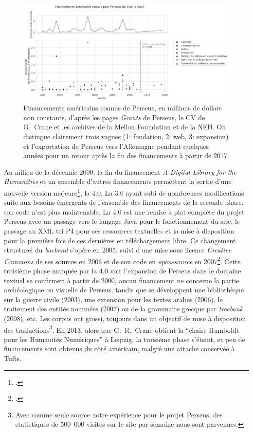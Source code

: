 \begin{figure}
    \centering
    \includegraphics[width=\linewidth]{figures/chap1/part1/PerseusFinancements.png}
    \caption{Financements américains connus de Perseus, en millions de dollars non constants, d'après les pages \textit{Grants} de Perseus, le CV de G.~Crane et les archives de la Mellon Foundation et de la NEH. On distingue clairement trois vagues (1: fondation, 2: web, 3: expansion) et l'exportation de Perseus vers l'Allemagne pendant quelques années pour un retour après la fin des financements à partir de 2017.}
    \label{fig:chap1:perseus_fundings}
\end{figure}

Au milieu de la décennie 2000, la fin du financement \textit{A Digital Library for the Humanities} et un ensemble d'autres financements permettent la sortie d'une nouvelle version majeure\footcite{noauthor_gregory_nodate}, la 4.0. La 3.0 ayant subi de nombreuses modifications suite aux besoins émergents de l'ensemble des financements de la seconde phase, son code n'est plus maintenable. La 4.0 est une remise à plat complète du projet Perseus avec un passage vers le langage Java pour le fonctionnement du site, le passage au XML \acrshort{tei} P4 pour ses ressources textuelles et la mise à disposition pour la première fois de ces dernières en téléchargement libre. Ce changement structurel du \textit{backend} s'opère en 2005, suivi d'une mise sous licence \textit{Creative Commons} de ses sources en 2006 et de son code en \textit{open-source} en 2007\footcite{rockwell_face_2013}. Cette troisième phase marquée par la 4.0 voit l'expansion de Perseus dans le domaine textuel se confirmer: à partir de 2000, aucun financement ne concerne la partie archéologique ou visuelle de Perseus, tandis que se développent une bibliothèque sur la guerre civile (2003), une extension pour les textes arabes (2006), le traitement des entités nommées (2007) ou de la grammaire grecque par \textit{treebank} (2008), etc. Les corpus ont grossi, toujours dans un objectif de mise à disposition des traductions\footnote{Avec comme seule source notre expérience pour le projet Perseus, des statistiques de 500~000 visites sur le site par semaine nous sont parvenues.}. En 2013, alors que G.~R.~Crane obtient la ``chaire Humboldt pour les Humanités Numériques'' à Leipzig, la troisième phase s'éteint, et peu de financements sont obtenus du côté américain, malgré une attache conservée à Tufts.


